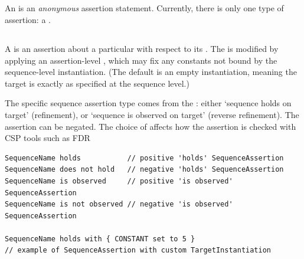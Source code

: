 \subsection{\massertion}

An \massertion{} is an \emph{anonymous} assertion statement.  Currently, there is
only one type of assertion: a \msequenceassertion{}.  

\subsection{\msequenceassertion}\label{ssec:metamodel-assertions-sequence}

A \msequenceassertion{} is an assertion about a particular \msequence{} with
respect to its \mtarget.  The \mtarget{} is modified by applying an
assertion-level \mtargetinstantiation, which may fix any constants not bound
by the sequence-level instantiation.  (The default is an empty instantiation,
meaning the target is exactly as specified at the sequence level.)

The specific sequence assertion type comes from the \msequenceassertiontype:
either `sequence holds on target' (refinement), or `sequence is observed on
target' (reverse refinement).  The assertion can be negated.  The choice of
\mcspmodel{} affects how the assertion is checked with CSP tools such as FDR

\begin{lstlisting}[style=Example]
SequenceName holds           // positive 'holds' SequenceAssertion
SequenceName does not hold   // negative 'holds' SequenceAssertion
SequenceName is observed     // positive 'is observed' SequenceAssertion
SequenceName is not observed // negative 'is observed' SequenceAssertion

SequenceName holds with { CONSTANT set to 5 }
// example of SequenceAssertion with custom TargetInstantiation
\end{lstlisting}

